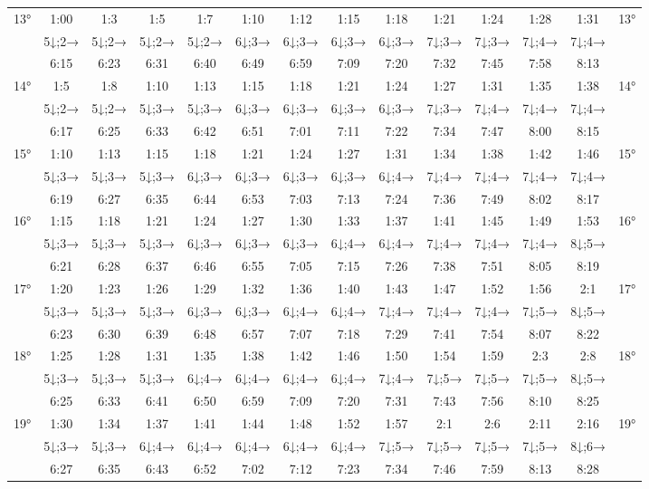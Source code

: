 \begin{scriptsize}
\begin{tabular}{c || c | c | c | c | c | c | c | c | c | c | c | c || c}
		\multirow{3}{*}{13°}&1:00&1:3&1:5&1:7&1:10&1:12&1:15&1:18&1:21&1:24&1:28&1:31&\multirow{3}{*}{13°}\\ \space&5↓;2→&5↓;2→&5↓;2→&5↓;2→&6↓;3→&6↓;3→&6↓;3→&6↓;3→&7↓;3→&7↓;3→&7↓;4→&7↓;4→&\space\\&6:15&6:23&6:31&6:40&6:49&6:59&7:09&7:20&7:32&7:45&7:58&8:13&\space\\\hline
		\multirow{3}{*}{14°}&1:5&1:8&1:10&1:13&1:15&1:18&1:21&1:24&1:27&1:31&1:35&1:38&\multirow{3}{*}{14°}\\ \space&5↓;2→&5↓;2→&5↓;3→&5↓;3→&6↓;3→&6↓;3→&6↓;3→&6↓;3→&7↓;3→&7↓;4→&7↓;4→&7↓;4→&\space\\&6:17&6:25&6:33&6:42&6:51&7:01&7:11&7:22&7:34&7:47&8:00&8:15&\space\\\hline
		\multirow{3}{*}{15°}&1:10&1:13&1:15&1:18&1:21&1:24&1:27&1:31&1:34&1:38&1:42&1:46&\multirow{3}{*}{15°}\\ \space&5↓;3→&5↓;3→&5↓;3→&6↓;3→&6↓;3→&6↓;3→&6↓;3→&6↓;4→&7↓;4→&7↓;4→&7↓;4→&7↓;4→&\space\\&6:19&6:27&6:35&6:44&6:53&7:03&7:13&7:24&7:36&7:49&8:02&8:17&\space\\\hline
		\multirow{3}{*}{16°}&1:15&1:18&1:21&1:24&1:27&1:30&1:33&1:37&1:41&1:45&1:49&1:53&\multirow{3}{*}{16°}\\ \space&5↓;3→&5↓;3→&5↓;3→&6↓;3→&6↓;3→&6↓;3→&6↓;4→&6↓;4→&7↓;4→&7↓;4→&7↓;4→&8↓;5→&\space\\&6:21&6:28&6:37&6:46&6:55&7:05&7:15&7:26&7:38&7:51&8:05&8:19&\space\\\hline
		\multirow{3}{*}{17°}&1:20&1:23&1:26&1:29&1:32&1:36&1:40&1:43&1:47&1:52&1:56&2:1&\multirow{3}{*}{17°}\\ \space&5↓;3→&5↓;3→&5↓;3→&6↓;3→&6↓;3→&6↓;4→&6↓;4→&7↓;4→&7↓;4→&7↓;4→&7↓;5→&8↓;5→&\space\\&6:23&6:30&6:39&6:48&6:57&7:07&7:18&7:29&7:41&7:54&8:07&8:22&\space\\\hline
		\multirow{3}{*}{18°}&1:25&1:28&1:31&1:35&1:38&1:42&1:46&1:50&1:54&1:59&2:3&2:8&\multirow{3}{*}{18°}\\ \space&5↓;3→&5↓;3→&5↓;3→&6↓;4→&6↓;4→&6↓;4→&6↓;4→&7↓;4→&7↓;5→&7↓;5→&7↓;5→&8↓;5→&\space\\&6:25&6:33&6:41&6:50&6:59&7:09&7:20&7:31&7:43&7:56&8:10&8:25&\space\\\hline
		\multirow{3}{*}{19°}&1:30&1:34&1:37&1:41&1:44&1:48&1:52&1:57&2:1&2:6&2:11&2:16&\multirow{3}{*}{19°}\\ \space&5↓;3→&5↓;3→&6↓;4→&6↓;4→&6↓;4→&6↓;4→&6↓;4→&7↓;5→&7↓;5→&7↓;5→&7↓;5→&8↓;6→&\space\\&6:27&6:35&6:43&6:52&7:02&7:12&7:23&7:34&7:46&7:59&8:13&8:28&\space\\\hline

\end{tabular}
\end{scriptsize}
